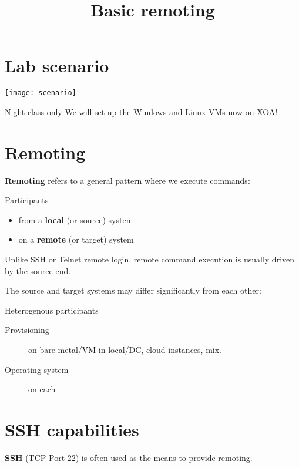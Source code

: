 \documentclass[slides]{pgnotes}
\title{Basic remoting}
\begin{document}
\maketitle

\tableofcontents

\section{Lab scenario}

\begin{center}
\texttt{[image: scenario]}
\end{center}

\begin{redbox}{Night class only}
  We will set up the Windows and Linux VMs now on XOA!
\end{redbox}

\section{Remoting}

\textbf{Remoting} refers to a general pattern where we execute commands:
\begin{bluebox}{Participants}
\begin{itemize}
\item from a \textbf{local} (or source) system
\item on a \textbf{remote} (or target) system
\end{itemize}  
\end{bluebox}
Unlike SSH or Telnet remote login, remote command execution is usually driven by the source end.

The source and target systems may differ significantly from each other:

\begin{bluebox}{Heterogenous participants}
\begin{description}
\item[Provisioning] on bare-metal/VM in local/DC, cloud instances, mix.
\item[Operating system] on each
\end{description}
\end{bluebox}


\section{SSH capabilities}

\textbf{SSH} (TCP Port 22) is often used as the means to provide remoting.
\end{document}
